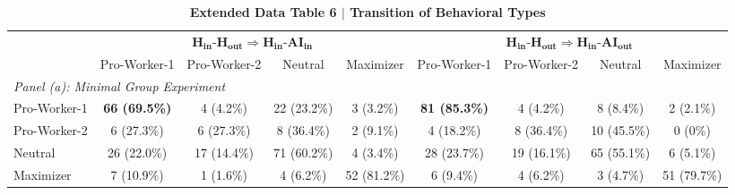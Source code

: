 \begin{table}[htbp]
\centering
\caption{\textbf{Extended Data Table 6 $\vert$ Transition of Behavioral Types}}
\label{tab:transition_types}
\small
\setlength{\tabcolsep}{4pt}
\begin{tabular}{lcccccccc}
\toprule\toprule
 & \multicolumn{4}{c}{$\mathbf{H_{in}}$-$\mathbf{H_{out}} \Rightarrow \mathbf{H_{in}}$-$\mathbf{AI_{in}}$} & \multicolumn{4}{c}{$\mathbf{H_{in}}$-$\mathbf{H_{out}} \Rightarrow \mathbf{H_{in}}$-$\mathbf{AI_{out}}$} \\
\cmidrule(lr){2-5} \cmidrule(lr){6-9}
 & Pro-Worker-1 & Pro-Worker-2 & Neutral & Maximizer & Pro-Worker-1 & Pro-Worker-2 & Neutral & Maximizer \\
\midrule
\multicolumn{9}{l}{\emph{Panel (a): Minimal Group Experiment}} \\
\quad Pro-Worker-1 & \textbf{66 (69.5\%)} & 4 (4.2\%) & 22 (23.2\%) & 3 (3.2\%) & \textbf{81 (85.3\%)} & 4 (4.2\%) & 8 (8.4\%) & 2 (2.1\%) \\
\quad Pro-Worker-2 & 6 (27.3\%) & 6 (27.3\%) & 8 (36.4\%) & 2 (9.1\%) & 4 (18.2\%) & 8 (36.4\%) & 10 (45.5\%) & 0 (0\%) \\
\quad Neutral & 26 (22.0\%) & 17 (14.4\%) & 71 (60.2\%) & 4 (3.4\%) & 28 (23.7\%) & 19 (16.1\%) & 65 (55.1\%) & 6 (5.1\%) \\
\quad Maximizer & 7 (10.9\%) & 1 (1.6\%) & 4 (6.2\%) & 52 (81.2\%) & 6 (9.4\%) & 4 (6.2\%) & 3 (4.7\%) & 51 (79.7\%) \\
\bottomrule\bottomrule
\end{tabular}
\end{table}
